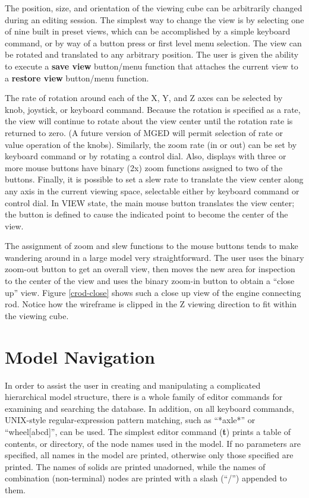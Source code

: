 The position, size, and orientation of the viewing cube can be
arbitrarily changed during an editing session.
The simplest way to change the view is by selecting one of nine
built in preset views, which can be accomplished by a simple keyboard
command, or by way of a button press or first level menu selection.
The view can be rotated and translated to any arbitrary position.
The user is given the ability to execute a {\bf save view} button/menu
function that attaches the current view to a {\bf restore view} button/menu
function.

The rate of rotation around each of the X, Y, and Z axes
can be selected by knob, joystick, or keyboard command.
Because the rotation is specified as a rate, the view
will continue to rotate about the view center until the rotation
rate is returned to zero.
(A future version of MGED will permit selection of rate or value
operation of the knobs).
Similarly, the zoom rate (in or out) can be set by keyboard
command or by rotating a control dial.
Also, displays with three or more mouse buttons have binary (2x) zoom
functions assigned to two of the buttons.
Finally, it is possible to set a slew rate to translate the view
center along any axis in the current viewing space, selectable
either by keyboard command or control dial.
In VIEW state, the main mouse button translates the
view center;  the button is defined to cause the indicated point to become
the center of the view.

The assignment of zoom and slew functions to the mouse buttons tends to
make wandering around in a large model very straightforward.
The user uses the binary zoom-out button to get an overall view, then
moves the new area for inspection to the center of the view and uses
the binary zoom-in button to obtain a ``close up'' view.
Figure \ref{crod-close}
shows such a close up view of the engine connecting rod.
Notice how the wireframe is clipped in the Z viewing direction
to fit within the viewing cube.

\section{Model Navigation}

In order to assist the user in creating and manipulating a complicated
hierarchical model structure, there is a whole family of editor commands
for examining and searching the database.
In addition, on all keyboard commands, UNIX-style regular-expression
pattern matching, such as ``*axle*'' or ``wheel[abcd]'', can be used.
The simplest editor command ({\bf t}) prints a table of contents, or directory,
of the node names used in the model.  If no parameters are specified,
all names in the model are printed,
otherwise only those specified are printed.
The names of solids are printed unadorned, while the names of combination
(non-terminal) nodes are printed with a slash (``/'') appended to them.

